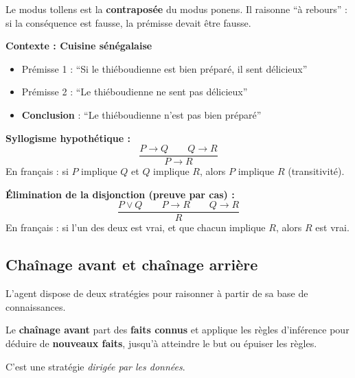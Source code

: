 \documentclass[11pt,a4paper]{article}
\begin{document}
Le modus tollens est la \textbf{contraposée} du modus ponens. Il raisonne ``à rebours'' : si la conséquence est fausse, la prémisse devait être fausse.

\begin{exemplebox}
\textbf{Contexte : Cuisine sénégalaise}
\begin{itemize}[nosep]
    \item Prémisse 1 : ``Si le thiéboudienne est bien préparé, il sent délicieux''
    \item Prémisse 2 : ``Le thiéboudienne ne sent pas délicieux''
    \item \textbf{Conclusion} : ``Le thiéboudienne n'est pas bien préparé''
\end{itemize}
\end{exemplebox}

\begin{theorembox}
\textbf{Syllogisme hypothétique :}
$$\frac{P \rightarrow Q \quad\quad Q \rightarrow R}{P \rightarrow R}$$
En français : si $P$ implique $Q$ et $Q$ implique $R$, alors $P$ implique $R$ (transitivité).

\textbf{Élimination de la disjonction (preuve par cas) :}
$$\frac{P \lor Q \quad\quad P \rightarrow R \quad\quad Q \rightarrow R}{R}$$
En français : si l'un des deux est vrai, et que chacun implique $R$, alors $R$ est vrai.
\end{theorembox}

\subsection{Chaînage avant et chaînage arrière}

L'agent dispose de deux stratégies pour raisonner à partir de sa base de connaissances.

\begin{definitionbox}
Le \textbf{chaînage avant} part des \textbf{faits connus} et applique les règles d'inférence pour déduire de \textbf{nouveaux faits}, jusqu'à atteindre le but ou épuiser les règles.

C'est une stratégie \textit{dirigée par les données}.
\end{definitionbox}
\end{document}
